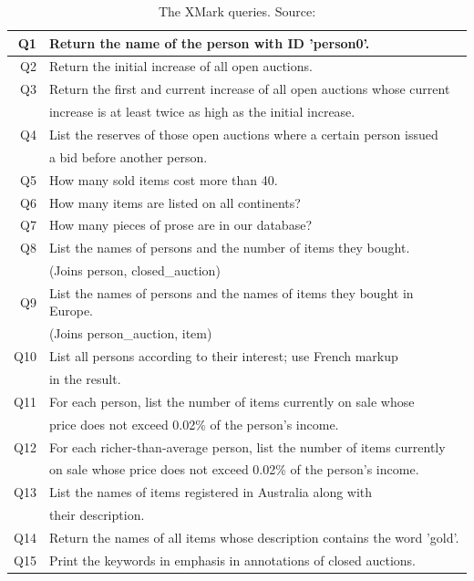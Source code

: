 \begin {table}[htpb] 
\centering
\caption {The XMark queries. Source:\citep{xmark/original}}
\label {tab:xmark-queries}
\begin{tabular}{r|l}
	\hline
	Q1&Return the name of the person with ID 'person0'.\\
	\hline
	Q2&Return the initial increase of all open auctions.\\
	\hline
	Q3&Return the first and current increase of all open auctions whose current\\
	&increase is at least twice as high as the initial increase.\\
	\hline
	Q4&List the reserves of those open auctions where a certain person issued\\
	&a bid before another person.\\
	\hline
	Q5&How many sold items cost more than 40.\\
	\hline
	Q6&How many items are listed on all continents?\\
	\hline
	Q7&How many pieces of prose are in our database?\\
	\hline
	Q8&List the names of persons and the number of items they bought.\\
	&(Joins person, closed\_auction)\\
	\hline
	Q9&List the names of persons and the names of items they bought in Europe.\\
	&(Joins person\_auction, item)\\
	\hline
	Q10&List all persons according to their interest; use French markup\\
	&in the result.\\
	\hline
	Q11&For each person, list the number of items currently on sale whose\\
	&price does not exceed 0.02\% of the person's income.\\
	\hline
	Q12&For each richer-than-average person, list the number of items currently\\
	&on sale whose price does not exceed 0.02\% of the person's income.\\
	\hline
	Q13&List the names of items registered in Australia along with\\
	&their description.\\
	\hline
	Q14&Return the names of all items whose description contains the word 'gold'.\\
	\hline
	Q15&Print the keywords in emphasis in annotations of closed auctions.\\

\end{tabular}
\end{table}

